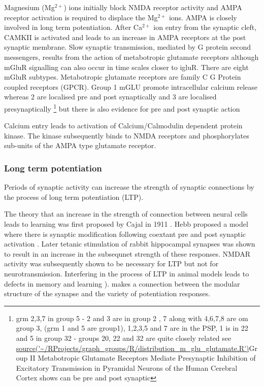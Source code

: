 Magnesium (Mg$^{2+}$) ions initially block NMDA receptor activity and  AMPA receptor activation is required to displace the Mg$^{2+}$ ions. AMPA is closely involved in long term potentiation. After Ca$^{2+}$ ion entry from the synaptic cleft, CAMKII is activated and leads to an increase in AMPA receptors at the post synaptic membrane. Slow synaptic transmission, mediated by G protein second messengers, results from the action of metabotropic glutamate receptors \cite{niswender2010metabotropic} although mGluR signalling can also occur in time scales closer to igluR. There are eight mGluR subtypes. Metabotropic glutamate receptors are family C G Protein coupled receptors (GPCR). Group 1 mGLU promote intracellular calcium release whereas 2 are localised pre and post synaptically  and 3 are localised presynaptically \cite{niswender2010metabotropic} \footnote{grm 2,3,7 in group 5 - 2 and 3 are in group 2 , 7 along with 4,6,7,8 are om group 3, (grm 1 and 5 are group1), 1,2,3,5 and 7 are in the PSP, 1 is in 22 and 5 in group 32 - groups 20, 22 and 32 are quite closely related see \url{ source('~/RProjects/graph_groups/R/distribution_m_glu_glutamate.R')}Group II Metabotropic Glutamate Receptors Mediate Presynaptic Inhibition of Excitatory Transmission in Pyramidal Neurons of the Human Cerebral Cortex shows can be pre and post synaptic } but there is also evidence for pre and post synaptic action 

Calcium entry leads to activation of Calcium/Calmodulin dependent protein kinase. The kinase subsequently binds to NMDA receptors and phosphorylates sub-units of the AMPA type glutamate receptor.
\subsubsection{Long term potentiation}
Periods of synaptic activity can increase the strength of synaptic connections by the process of long term potentiation (LTP).

The theory that an increase in the strength of connection between neural cells leads to learning was first proposed by Cajal in 1911 \cite{nicoll2017brief}. Hebb proposed a model where there is synaptic modification following coextant pre and post synaptic activation \cite{hebb1949organization_check}. Later tetanic stimulation of rabbit hippocampal synapses was shown to result in an increase in the subsequnet strength of these responses.\cite{bliss1973long} NMDAR activity was subsequently shown to be necessary for LTP \cite{collingridge1983excitatory} but not for neurotransmission. 
 Interfering in the process of LTP in animal models leads to defects in memory and learning \cite{lisman2012mechanisms}).
 \cite{lisman2017glutamatergic} makes a connection between the modular structure of the synapse and the variety of potentiation responses.
 
